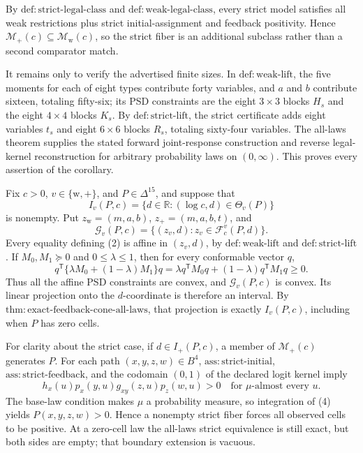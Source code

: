 By \(\mathrm{def{:}strict\text{-}legal\text{-}class}\) and \(\mathrm{def{:}weak\text{-}legal\text{-}class}\), every strict model satisfies all weak restrictions plus strict initial-assignment and feedback positivity.  Hence \(\mathcal M_+(c)\subseteq\mathcal M_{\mathrm w}(c)\), so the strict fiber is an additional subclass rather than a second comparator match.

It remains only to verify the advertised finite sizes.  In \(\mathrm{def{:}weak\text{-}lift}\), the five moments for each of eight types contribute forty variables, and \(a\) and \(b\) contribute sixteen, totaling fifty-six; its PSD constraints are the eight \(3\times3\) blocks \(H_s\) and the eight \(4\times4\) blocks \(K_s\).  By \(\mathrm{def{:}strict\text{-}lift}\), the strict certificate adds eight variables \(t_s\) and eight \(6\times6\) blocks \(R_s\), totaling sixty-four variables.  The all-laws theorem supplies the stated forward joint-response construction and reverse legal-kernel reconstruction for arbitrary probability laws on \((0,\infty)\).  This proves every assertion of the corollary.

Fix \(c>0\), \(v\in\{\mathrm w,+\}\), and \(P\in\Delta^{15}\), and suppose that
\[
 I_v(P,c)=\{d\in\mathbb R:(\log c,d)\in\Theta_v(P)\} \tag{1}
\]
is nonempty.  Put \(z_{\mathrm w}=(m,a,b)\), \(z_+=(m,a,b,t)\), and
\[
 \mathcal G_v(P,c)=\{(z_v,d):z_v\in\mathcal F_c^v(P,d)\}. \tag{2}
\]
Every equality defining (2) is affine in \((z_v,d)\), by \(\mathrm{def{:}weak\text{-}lift}\) and \(\mathrm{def{:}strict\text{-}lift}\).  If \(M_0,M_1\succeq0\) and \(0\le\lambda\le1\), then for every conformable vector \(q\),
\[
 q^{\mathsf T}\{\lambda M_0+(1-\lambda)M_1\}q
 =\lambda q^{\mathsf T}M_0q+(1-\lambda)q^{\mathsf T}M_1q\ge0. \tag{3}
\]
Thus all the affine PSD constraints are convex, and \(\mathcal G_v(P,c)\) is convex.  Its linear projection onto the \(d\)-coordinate is therefore an interval.  By \(\mathrm{thm{:}exact\text{-}feedback\text{-}cone\text{-}all\text{-}laws}\), that projection is exactly \(I_v(P,c)\), including when \(P\) has zero cells.

For clarity about the strict case, if \(d\in I_+(P,c)\), a member of \(\mathcal M_+(c)\) generates \(P\).  For each path \((x,y,z,w)\in B^4\), \(\mathrm{ass{:}strict\text{-}initial}\), \(\mathrm{ass{:}strict\text{-}feedback}\), and the codomain \((0,1)\) of the declared logit kernel imply
\[
 h_x(u)p_x(y,u)g_{xy}(z,u)p_z(w,u)>0
 \quad\text{for }\mu\text{-almost every }u. \tag{4}
\]
The base-law condition makes \(\mu\) a probability measure, so integration of (4) yields \(P(x,y,z,w)>0\).  Hence a nonempty strict fiber forces all observed cells to be positive.  At a zero-cell law the all-laws strict equivalence is still exact, but both sides are empty; that boundary extension is vacuous.

